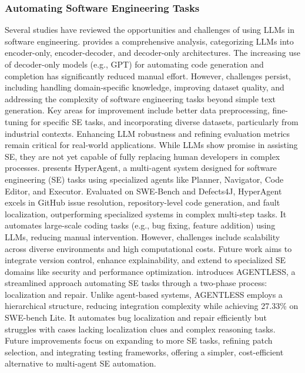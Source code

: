 \subsubsection{Automating Software Engineering Tasks}
Several studies have reviewed the opportunities and challenges of using LLMs in software engineering. \citet{hou2023large} provides a comprehensive analysis, categorizing LLMs into encoder-only, encoder-decoder, and decoder-only architectures. The increasing use of decoder-only models (e.g., GPT) for automating code generation and completion has significantly reduced manual effort. However, challenges persist, including handling domain-specific knowledge, improving dataset quality, and addressing the complexity of software engineering tasks beyond simple text generation. Key areas for improvement include better data preprocessing, fine-tuning for specific SE tasks, and incorporating diverse datasets, particularly from industrial contexts. Enhancing LLM robustness and refining evaluation metrics remain critical for real-world applications. While LLMs show promise in assisting SE, they are not yet capable of fully replacing human developers in complex processes.
\citet{phan2024hyperagent} presents HyperAgent, a multi-agent system designed for software engineering (SE) tasks using specialized agents like Planner, Navigator, Code Editor, and Executor. Evaluated on SWE-Bench and Defects4J, HyperAgent excels in GitHub issue resolution, repository-level code generation, and fault localization, outperforming specialized systems in complex multi-step tasks. It automates large-scale coding tasks (e.g., bug fixing, feature addition) using LLMs, reducing manual intervention. However, challenges include scalability across diverse environments and high computational costs. Future work aims to integrate version control, enhance explainability, and extend to specialized SE domains like security and performance optimization. \citet{xia2024agentless} introduces AGENTLESS, a streamlined approach automating SE tasks through a two-phase process: localization and repair. Unlike agent-based systems, AGENTLESS employs a hierarchical structure, reducing integration complexity while achieving 27.33\% on SWE-bench Lite. It automates bug localization and repair efficiently but struggles with cases lacking localization clues and complex reasoning tasks. Future improvements focus on expanding to more SE tasks, refining patch selection, and integrating testing frameworks, offering a simpler, cost-efficient alternative to multi-agent SE automation.

